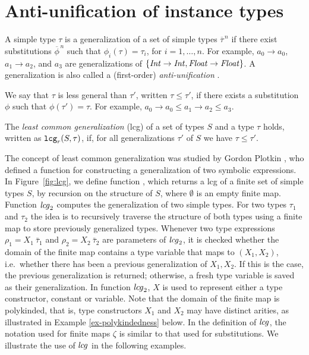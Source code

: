 \section{Anti-unification of instance types}
\label{sec:anti-unif}

A simple type $\tau$ is a generalization of a set of simple types
$\overline{\tau}^{\,n}$ if there exist substitutions
$\overline{\phi}^{\,n}$ such that $\phi_i(\tau)=\tau_i$, for
$i=1,\ldots,n$. For example, $a_0 \rightarrow a_0$, $a_1 \rightarrow
a_2$, and $a_3$ are generalizations of $\{ {\it Int\/} \rightarrow {\it Int\/},
{\it Float\/} \rightarrow {\it Float\/}\}$. A generalization is also called a
(first-order) {\em anti-unification\/} \cite{ModelTheory2012}.

We say that $\tau$ is less general than $\tau'$, written $\tau \leq
\tau'$, if there exists a substitution $\phi$ such that $\phi(\tau') =
\tau$.  For example, $a_0 \rightarrow a_0 \leq a_1 \rightarrow a_2
\leq a_3$.

The {\it least common generalization} (lcg) of a set of types
$S$ and a type $\tau$ holds, written as ${\tt lcg}_r(S,\tau)$, if, for all generalizations $\tau'$ of
$S$ we have $\tau \leq \tau'$.

The concept of least common generalization was studied by Gordon
Plotkin \cite{plotkin1970note,plotkin1971further}, who defined a
function for constructing a generalization of two symbolic
expressions.  In Figure~\ref{fig:lcg}, we define function \lcg, which
returns a lcg of a finite set of simple types $S$, by recursion on the
structure of $S$, where $\emptyset$ is an empty finite map. Function
${\it lcg\/}_2$ computes the generalization of two simple types. For two
types $\tau_1$ and $\tau_2$ the idea is to recursively traverse the
structure of both types using a finite map to store previously
generalized types. Whenever two type expressions $\rho_1 =
X_1\:\bar{\tau}_1$ and $\rho_2 = X_2\:\bar{\tau}_2$ are parameters
of ${\it lcg\/}_2$, it is checked whether the domain of the finite map
contains a type variable that maps to $(X_1, X_2)$, i.e.~whether there
has been a previous generalization of $X_1, X_2$. If this is the case,
the previous generalization is returned; otherwise, a fresh type
variable is saved as their generalization. In function ${\it lcg\/}_2$, $X$
is used to represent either a type constructor, constant or
variable. Note that the domain of the finite map is polykinded, that
is, type constructors $X_1$ and $X_2$ may have distinct arities, as
illustrated in Example \ref{ex-polykindedness} below. In the
definition of ${\it lcg\/}$, the notation used for finite maps $\zeta$ is
similar to that used for substitutions. We illustrate the use of
${\it lcg\/}$ in the following examples.

